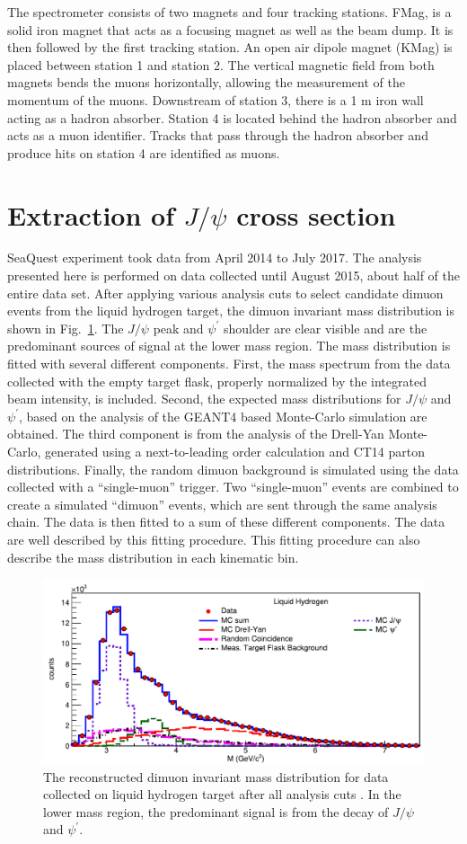 \documentclass[10pt,a4paper,final]{article}
\begin{document}
The spectrometer consists of two magnets and four tracking stations. FMag, is a
solid iron magnet that acts as a focusing magnet as well as the beam dump. It is
then followed by the first tracking station. An open air dipole magnet (KMag) is
placed between station 1 and station 2. The vertical magnetic field from both
magnets bends the muons horizontally, allowing the measurement of the momentum
of the muons. Downstream of station 3, there is a 1 m iron wall acting as a
hadron absorber. Station 4 is located behind the hadron absorber and acts as a
muon identifier. Tracks that pass through the hadron absorber and
produce hits on station 4 are identified as  muons.

\section{Extraction of \texorpdfstring{$J/\psi$}{J/psi} cross section}
\label{sec:result}
SeaQuest experiment took data from April 2014 to July 2017. The analysis
presented here is performed on data collected until August 2015, about half
of the entire data set. After applying various analysis cuts to select
candidate dimuon events from the liquid hydrogen target, the dimuon invariant
mass distribution is shown in Fig.~\ref{fig:mass}. The $J/\psi$ peak and $\psi^\prime$
shoulder are clear visible and are the predominant sources of signal at the
lower mass region. The mass distribution is fitted with several different
components. First, the mass spectrum from the data collected with the
empty target flask, properly normalized by the integrated beam intensity,
is included. Second, the expected mass distributions for $J/\psi$ and
$\psi^\prime$, based on the analysis of the GEANT4 based Monte-Carlo
simulation are obtained.
The third component is from the analysis of the Drell-Yan
Monte-Carlo, generated using a next-to-leading order calculation and CT14 parton
distributions. Finally, the random dimuon background is simulated 
using the data collected with a ``single-muon'' trigger. Two ``single-muon''
events are combined to create a simulated ``dimuon'' events, which are sent
through the same analysis chain. The data is then fitted to a sum of these
different components. The data are well described by this fitting procedure.
This fitting procedure can also describe the mass distribution in each kinematic bin.

\begin{figure}[h!]
	\centering
	\includegraphics[width=0.65\linewidth]{extFig3_LH2}
	\caption{The reconstructed dimuon invariant mass distribution for data collected on
		liquid hydrogen target after all analysis cuts \cite{dove2021}.
		In the lower mass region, the predominant signal is from the decay
		of $J/\psi$ and $\psi^\prime$. }
	\label{fig:mass}
\end{figure}
\end{document}
